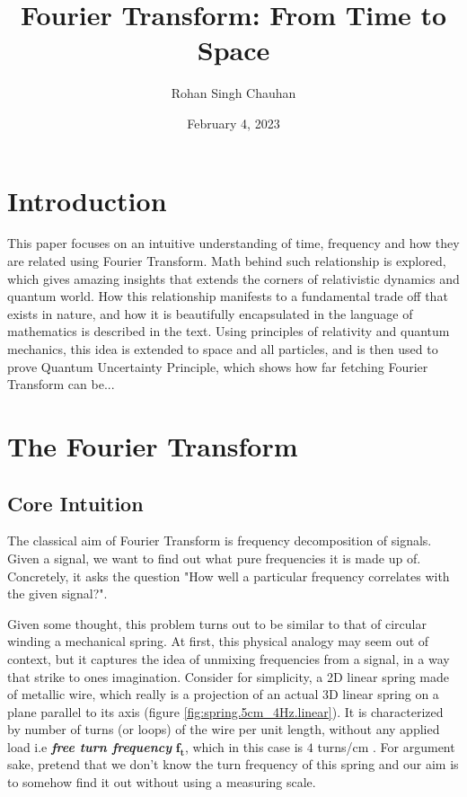 \documentclass[11pt, a4paper]{article}
\title{Fourier Transform: From Time to Space}
\author{Rohan Singh Chauhan}
\date{February 4, 2023}
\let\oldsection\section
\renewcommand{\section}{%
	\setcounter{equation}{0}%
	\oldsection%
}
\begin{document}
	\maketitle
	
	\section{Introduction}\label{sec:intro}
	This paper focuses on an intuitive understanding of time, frequency and how they are related using Fourier Transform. Math behind such relationship is explored, which gives amazing insights that extends the corners of relativistic dynamics and quantum world. How this relationship manifests to a fundamental trade off that exists in nature, and how it is beautifully encapsulated in the language of mathematics is described in the text. Using principles of relativity and quantum mechanics, this idea is extended to space and all particles, and is then used to prove Quantum Uncertainty Principle, which shows how far fetching Fourier Transform can be...
	
	\section{The Fourier Transform}\label{sec:fourier_transform}
	\subsection{Core Intuition}\label{sec:fourier_transform_intuition_2D_spring}
	The classical aim of Fourier Transform is frequency decomposition of signals. Given a signal, we want to find out what pure frequencies it is made up of. Concretely, it asks the question "How well a particular frequency correlates with the given signal?". 
	
	Given some thought, this problem turns out to be similar to that of circular winding a mechanical spring. At first, this physical analogy may seem out of context, but it captures the idea of unmixing frequencies from a signal, in a way that strike to ones imagination. Consider for simplicity, a 2D linear spring made of metallic wire, which really is a projection of an actual 3D linear spring on a plane parallel to its axis (figure \ref{fig:spring.5cm_4Hz.linear}). It is characterized by number of turns (or loops) of the wire per unit length, without any applied load i.e \textbf{\textit{free turn frequency}} $\boldsymbol{f_{t}}$, which in this case is $4$ turns/cm . For argument sake, pretend that we don't know the turn frequency of this spring and our aim is to somehow find it out without using a measuring scale.
	
\end{document}
